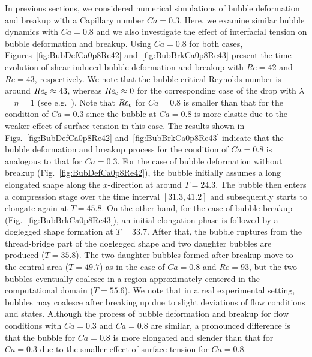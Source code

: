 \documentclass[%
 reprint,
 showkeys,
 amsmath,amssymb,
 aps,
 prfluids,
 onecolumn
]{revtex4-2}
\begin{document}
%
%
In previous sections, we considered numerical simulations of bubble deformation
and breakup with a Capillary number $Ca = 0.3$.  Here, we examine similar
bubble dynamics with $Ca = 0.8$ and we also investigate the effect of
interfacial tension on bubble deformation and breakup.  Using $Ca=0.8$ for both
cases, Figures~\ref{fig:BubDefCa0p8Re42} and~\ref{fig:BubBrkCa0p8Re43} present
the time evolution of shear-induced bubble deformation and breakup with $Re=42$
and $Re=43$, respectively.  We note that the bubble critical Reynolds number is
around $Re_{\rm c} \approx 43$, whereas $Re_{\rm c} \approx 0$ for the corresponding
case of the drop with 
$\lambda$ = $\eta$ = 1 (see e.g.~\cite{LiRenRen00}).
Note that $Re_{\rm c}$ for $Ca = 0.8$ is smaller than that for the condition of $Ca
= 0.3$ since the bubble at $Ca = 0.8$ is more elastic due to the weaker effect
of surface tension in this case.  The results shown in
Figs.~\ref{fig:BubDefCa0p8Re42} and~\ref{fig:BubBrkCa0p8Re43} indicate that the
bubble deformation and breakup process for the condition of $Ca = 0.8$ is
analogous to that for $Ca = 0.3$.  For the case of bubble deformation without
breakup (Fig.~\ref{fig:BubDefCa0p8Re42}), the bubble initially assumes a long
elongated shape along the $x$-direction at around $T=24.3$. The bubble then
enters a compression stage over the time interval $[31.3,41.2]$ and
subsequently starts to elongate again at $T = 45.8$.  On the other hand, for
the case of bubble breakup (Fig.~\ref{fig:BubBrkCa0p8Re43}), an initial
elongation phase is followed by a doglegged shape formation at $T=33.7$.  After
that, the bubble ruptures from the thread-bridge part of the doglegged shape
and two daughter bubbles are produced ($T = 35.8$).  The two daughter bubbles
formed after breakup move to the central area ($T = 49.7$) as in the case of
$Ca = 0.8$ and $Re = 93$, but the two bubbles eventually coalesce in a region
approximately centered in the computational domain ($T = 55.6$).  We note that
in a real experimental setting, bubbles may coalesce after breaking up due to
slight deviations of flow conditions and states.  Although the process of
bubble deformation and breakup for flow conditions with $Ca = 0.3$ and $Ca =
0.8$ are similar, a pronounced difference is that the bubble for $Ca = 0.8$ is
more elongated and slender than that for $Ca = 0.3$ due to the smaller effect
of surface tension for $Ca = 0.8$.
\end{document}
